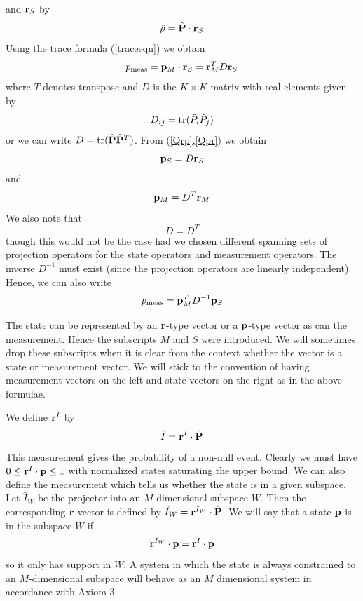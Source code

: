 \documentclass[10pt,twocolumn]{article}
\begin{document}
and ${\bf r}_S$ by
\begin{equation}\label{rhoPr}
\hat{\rho}=\hat{\bf P}\cdot {\bf r}_S
\end{equation}
Using the trace formula (\ref{traceeqn}) we obtain
\begin{equation}\label{Qpr}
p_{\rm meas}= {\bf p}_M\cdot{\bf r}_S={\bf r}^T_M D {\bf r}_S
\end{equation}
where $T$ denotes transpose and $D$ is the $K\times K$ matrix with
real elements given by
\begin{equation}\label{QDij}
D_{ij}={\rm tr}(\hat{P}_i\hat{P}_j)
\end{equation}
or we can write $D={\rm tr}(\hat{\bf P}\hat{\bf P}^T)$.
From (\ref{Qrp},\ref{Qpr}) we obtain
\begin{equation}\label{QpDr}
{\bf p}_S=D{\bf r}_S
\end{equation}
and
\begin{equation}
{\bf p}_M=D^T {\bf r}_M
\end{equation}
We also note that
\begin{equation}
D=D^T
\end{equation}
though this would not be the case  had we chosen different spanning sets
of projection operators for the state operators and measurement operators.
The inverse $D^{-1}$ must exist (since the projection operators are
linearly independent).  Hence, we can also write
\begin{equation}
p_{\rm meas}= {\bf p}_M^T D^{-1} {\bf p}_S
\end{equation}

The state can be represented by an ${\bf r}$-type vector or a
${\bf p}$-type vector
as can the measurement.  Hence the subscripts $M$ and $S$ were
introduced.  We will sometimes drop these subscripts when it is clear
from the context whether the vector is a state or measurement vector.
We will stick to the convention of having measurement vectors on the
left and state vectors on the right as in the above formulae.

We define ${\bf r}^I$ by
\begin{equation}
\hat{I}={\bf r}^I\cdot\hat{\bf P}
\end{equation}
This measurement gives the probability of a non-null event. Clearly we
must have $0\leq {\bf r}^I\cdot{\bf p} \leq 1$ with normalized states
saturating the upper bound.
We can also define the measurement which tells us whether the state is
in a given subspace.  Let $\hat{I}_W$ be the projector into an $M$
dimensional subspace $W$.  Then the corresponding ${\bf r}$ vector is
defined by $\hat{I}_W={\bf r}^{I_W}\cdot\hat{\bf P}$.  We will
say that a state $\bf p$ is in the subspace $W$ if
\begin{equation}
{\bf r}^{I_W}\cdot{\bf p}={\bf r}^I\cdot{\bf p}
\end{equation}
so it only has support in $W$.  A system in which the state is always
constrained to an $M$-dimensional subspace will behave as an $M$
dimensional system in accordance with Axiom 3.
\end{document}
